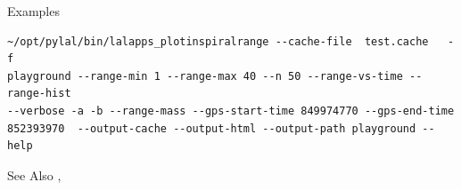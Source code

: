 \begin{manpage}{}
\begin{mansection}{Examples}
\begin{verbatim}
~/opt/pylal/bin/lalapps_plotinspiralrange --cache-file  test.cache   -f
playground --range-min 1 --range-max 40 --n 50 --range-vs-time --range-hist
--verbose -a -b --range-mass --gps-start-time 849974770 --gps-end-time
852393970  --output-cache --output-html --output-path playground --help
\end{verbatim}
\end{mansection}



\begin{mansection}{See Also}
, 
\end{mansection}

\end{manpage}

\clearpage

